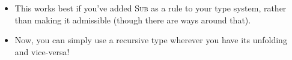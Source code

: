 \documentclass{lecturenotes}
\newcommand{\rectype}[2]{\ensuremath{\mu #1.\,#2}}
\newcommand{\subtype}{\ensuremath{\mathrel{\mathord{<}\mathord{:}}}}
\begin{document}

\begin{itemize}
\item This works best if you've added \textsc{Sub} as a rule to your type system, rather than making it admissible (though there are ways around that).
\item Now, you can simply use a recursive type wherever you have its unfolding and vice-versa!
\end{itemize}
\end{document}
